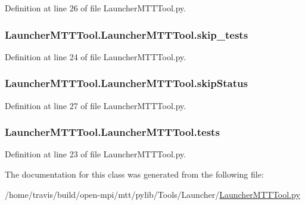 Definition at line 26 of file Launcher\-M\-T\-T\-Tool.\-py.

\hypertarget{class_launcher_m_t_t_tool_1_1_launcher_m_t_t_tool_a03696ab743c22417d3be183903c20a68}{
\subsubsection[{skip\-\_\-tests}]{\setlength{\rightskip}{0pt plus 5cm}Launcher\-M\-T\-T\-Tool.\-Launcher\-M\-T\-T\-Tool.\-skip\-\_\-tests}}\label{class_launcher_m_t_t_tool_1_1_launcher_m_t_t_tool_a03696ab743c22417d3be183903c20a68}


Definition at line 24 of file Launcher\-M\-T\-T\-Tool.\-py.

\hypertarget{class_launcher_m_t_t_tool_1_1_launcher_m_t_t_tool_a4d5ba97c121703a52364ba25f4a2546b}{
\subsubsection[{skip\-Status}]{\setlength{\rightskip}{0pt plus 5cm}Launcher\-M\-T\-T\-Tool.\-Launcher\-M\-T\-T\-Tool.\-skip\-Status}}\label{class_launcher_m_t_t_tool_1_1_launcher_m_t_t_tool_a4d5ba97c121703a52364ba25f4a2546b}


Definition at line 27 of file Launcher\-M\-T\-T\-Tool.\-py.

\hypertarget{class_launcher_m_t_t_tool_1_1_launcher_m_t_t_tool_a2810a82208a2846540adffee0a6855f7}{
\subsubsection[{tests}]{\setlength{\rightskip}{0pt plus 5cm}Launcher\-M\-T\-T\-Tool.\-Launcher\-M\-T\-T\-Tool.\-tests}}\label{class_launcher_m_t_t_tool_1_1_launcher_m_t_t_tool_a2810a82208a2846540adffee0a6855f7}


Definition at line 23 of file Launcher\-M\-T\-T\-Tool.\-py.



The documentation for this class was generated from the following file\-:\begin{DoxyCompactItemize}
\item 
/home/travis/build/open-\/mpi/mtt/pylib/\-Tools/\-Launcher/\hyperlink{_launcher_m_t_t_tool_8py}{Launcher\-M\-T\-T\-Tool.\-py}\end{DoxyCompactItemize}
